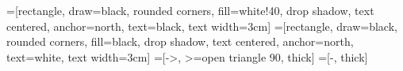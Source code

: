 \documentclass{minimal}
\begin{document}
\newcommand{\SECONDb}{1}
\newcommand{\THIRDa}{1}
\newcommand{\THIRDb}{1}
\newcommand{\THIRDc}{1}
\newcommand{\THIRDd}{1}
\newcommand{\FOURTHc}{1}
\newcommand{\FOURTHd}{1}

\newcommand{\topitem}{Student}
\newcommand{\topitemnil}{nil}
\newcommand{\seconditemone}{UnderGrad}
\newcommand{\seconditemonenil}{nil}
\newcommand{\seconditemtwo}{GradStudent}
\newcommand{\seconditemtwonil}{nil}
\newcommand{\thirditemone}{THIRDa}
\newcommand{\thirditemonenil}{nil}
\newcommand{\thirditemtwo}{THIRDb}
\newcommand{\thirditemtwonil}{nil}
\newcommand{\thirditemL}{FOURTHa}
\newcommand{\thirditemLnil}{nil}

=[rectangle, draw=black, rounded corners, fill=white!40, drop shadow,
        text centered, anchor=north, text=black, text width=3cm]
=[rectangle, draw=black, rounded corners, fill=black, drop shadow,
        text centered, anchor=north, text=white, text width=3cm]
=[->, >=open triangle 90, thick]
=[-, thick]
        
\end{document}
